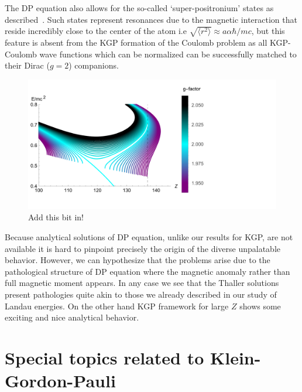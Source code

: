 The DP equation also allows for the so-called `super-positronium' states as described~\cite{Barut:1975hz,Barut:1976hs}. Such states represent resonances due to the magnetic interaction that reside incredibly close to the center of the atom i.e $\sqrt{\langle r^{2}\rangle}\approx a\alpha\hbar/mc$, but this feature is absent from the KGP formation of the Coulomb problem as all KGP-Coulomb wave functions which can be normalized can be successfully matched to their Dirac ($g\!=\!2$) companions.

\begin{figure}[ht]
    \centering
    \includegraphics[clip, trim=0.0cm 0.0cm 8.0cm 0.0cm,width=0.95\linewidth]{plots/chap02moment/lanplot05.pdf}
     \caption{Add this bit in!}
    \label{fig:gspec}
\end{figure}

Because analytical solutions of DP equation, unlike our results for KGP, are not available it is hard to pinpoint precisely the origin of the diverse unpalatable behavior. However, we can hypothesize that the problems arise due to the pathological structure of DP equation where the magnetic anomaly rather than full magnetic moment appears. In any case we see that the Thaller solutions present pathologies quite akin to those we already described in our study of Landau energies. On the other hand KGP framework for large $Z$ shows some exciting and nice analytical behavior.

\section{Special topics related to Klein-Gordon-Pauli}
\label{sec:kgptopics}
